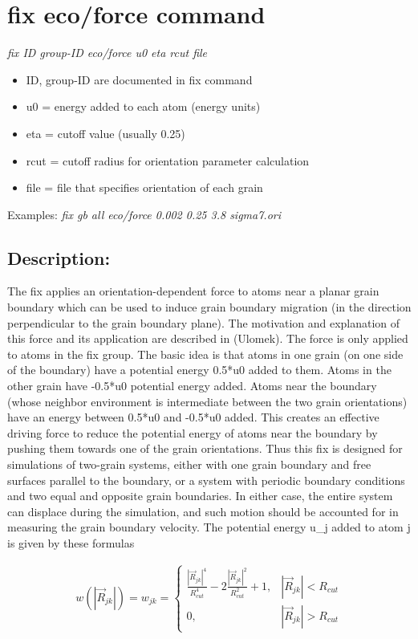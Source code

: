 \documentclass[11pt]{article}
\begin{document}
\section{fix eco/force command}
\emph{fix ID group-ID eco/force u0 eta rcut file}
\begin{itemize}
\item{ID, group-ID are documented in fix command}
\item{u0 = energy added to each atom (energy units)}
\item{eta = cutoff value (usually 0.25)}
\item{rcut = cutoff radius for orientation parameter calculation}
\item{file = file that specifies orientation of each grain}
\end{itemize}
Examples:
\emph{fix gb all eco/force 0.002 0.25 3.8 sigma7.ori}
\subsection{Description:}
The fix applies an orientation-dependent force to atoms near a planar grain boundary which can be used to induce grain boundary migration (in the direction perpendicular to the grain boundary plane). The motivation and explanation of this force and its application are described in (Ulomek). The force is only applied to atoms in the fix group.
The basic idea is that atoms in one grain (on one side of the boundary) have a potential energy 0.5*u0 added to them. Atoms in the other grain have -0.5*u0 potential energy added. Atoms near the boundary (whose neighbor environment is intermediate between the two grain orientations) have an energy between 0.5*u0 and -0.5*u0 added. This creates an effective driving force to reduce the potential energy of atoms near the boundary by pushing them towards one of the grain orientations. Thus this fix is designed for simulations of two-grain systems, either with one grain boundary and free surfaces parallel to the boundary, or a system with periodic boundary conditions and two equal and opposite grain boundaries. In either case, the entire system can displace during the simulation, and such motion should be accounted for in measuring the grain boundary velocity.
The potential energy u\_j added to atom j is given by these formulas

\begin{eqnarray}
w(|\vec{R}_{jk}|)=w_{jk}=\left\{\begin{array}{lc}
\frac{|\vec{R}_{jk}|^{4}}{R_{cut}^{4}}-2\frac{|\vec{R}_{jk}|^{2}}{R_{cut}^{2}}+1, & |\vec{R}_{jk}|<R_{cut} \\
0, & |\vec{R}_{jk}|>R_{cut}
\end{array}\right.
\label{eq:envelope}
\end{eqnarray}
\end{document}
